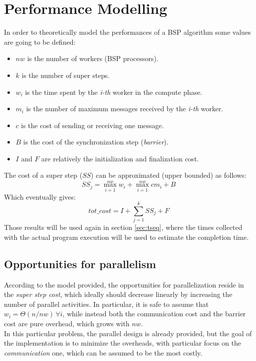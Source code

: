 \documentclass[]{article}
\begin{document}
\section{Performance Modelling}
\label{sec:perfModel}

In order to theoretically model the performances of a BSP algorithm some values are going to be defined:
\begin{itemize}
	\item $\mathit{nw}$ is the number of workers (BSP processors).
	\item $k$ is the number of super steps.
	\item $w_i$ is the time spent by the \emph{i-th} worker in the compute phase.
	\item $m_i$ is the number of maximum messages received by the \emph{i-th} worker.
	\item $c$ is the cost of sending or receiving one message.
	\item $B$ is the cost of the synchronization step (\emph{barrier}).
	\item $I$ and $F$ are relatively the initialization and finalization cost.
\end{itemize}
The cost of a super step ($\mathit{SS}$) can be approximated (upper bounded) as follows:
$$ \mathit{SS}_j = \max_{i=1}^{\mathit{nw}} w_i + \max_{i=1}^{\mathit{nw}} c m_i + B $$
Which eventually gives:
$$ \mathit{tot\_cost} = I + \sum_{j=1}^{k} \mathit{SS}_j + F $$ 
Those results will be used again in section \ref{sec:tseq}, where the times collected with the actual program execution will be used to estimate the completion time.

\subsection{Opportunities for parallelism}
According to the model provided, the opportunities for parallelization reside in the \emph{super step cost}, which ideally should decrease linearly by increasing the number of parallel activities. In particular, it is safe to assume that $w_i = \Theta(n/\mathit{nw}) \, \forall i$, while instead both the communication cost and the barrier cost are pure overhead, which grows with $\mathit{nw}$. \\
In this particular problem, the parallel design is already provided, but the goal of the implementation is to minimize the overheads, with particular focus on the \emph{communication} one, which can be assumed to be the most costly. \\
\end{document}
